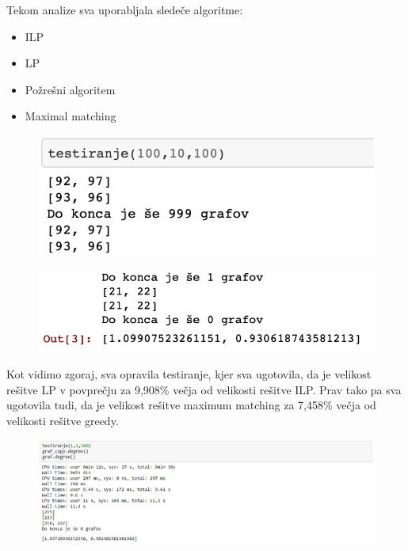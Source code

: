 \documentclass[12pt,a4paper]{amsart}
\theoremstyle{definition} %
\theoremstyle{plain} %
\begin{document}
Tekom analize sva uporabljala sledeče algoritme:
\begin{itemize}
\item ILP
\item LP
\item Požrešni algoritem
\item Maximal matching

 \end{itemize}

 \hspace*{\fill} %



\begin{figure}[ht]
\centering
\includegraphics[width=.6\textwidth]{Screen7.png}
\end{figure}


\begin{figure}[ht]
\centering
\includegraphics[width=.7\textwidth]{Screen8.png}
\end{figure}

Kot vidimo zgoraj, sva opravila testiranje, kjer sva ugotovila, da je velikost rešitve LP v povprečju za 9,908\% večja od velikosti rešitve ILP. Prav tako pa sva ugotovila tudi, da je velikost rešitve maximum matching za 7,458\% večja od velikosti rešitve greedy.

\newpage


\begin{figure}[ht]
\centering
\includegraphics[width=1\textwidth]{Screen9.png}
\end{figure}
\end{document}
